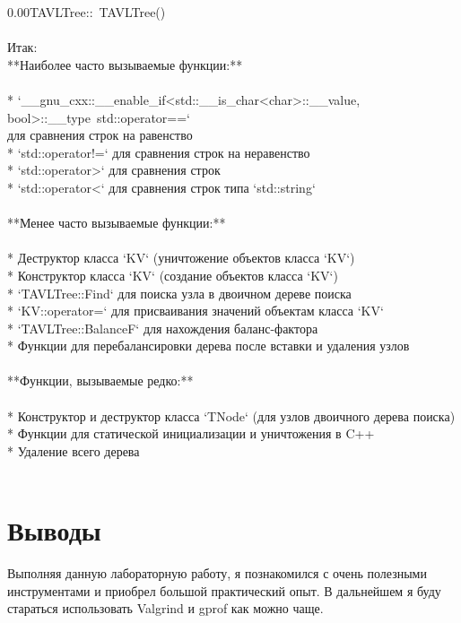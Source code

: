 \documentclass[pdf, unicode, 12pt, a4paper,oneside,fleqn]{article}
\begin{document}
\begin{tabbing}
0.00\>TAVLTree::~TAVLTree() \\
\\
Итак: \\
**Наиболее часто вызываемые функции:** \\
\\
* `\_\_gnu\_cxx::\_\_enable\_if<std::\_\_is\_char<char>::\_\_value, bool>::\_\_type\ std::operator==` \\ для сравнения строк на равенство \\
* `std::operator!=` для сравнения строк на неравенство \\
* `std::operator>` для сравнения строк \\
* `std::operator<` для сравнения строк типа `std::string` \\
\\
**Менее часто вызываемые функции:** \\
\\
* Деструктор класса `KV` (уничтожение объектов класса `KV`) \\ 
* Конструктор класса `KV` (создание объектов класса `KV`) \\ 
* `TAVLTree::Find` для поиска узла в двоичном дереве поиска \\
* `KV::operator=` для присваивания значений объектам класса `KV` \\
* `TAVLTree::BalanceF` для нахождения баланс-фактора \\
* Функции для перебалансировки дерева после вставки и удаления узлов \\ 
\\
**Функции, вызываемые редко:** \\ 
\\
* Конструктор и деструктор класса `TNode` (для узлов двоичного дерева поиска) \\
* Функции для статической инициализации и уничтожения в C++ \\ 
* Удаление всего дерева \\
\\

\end{tabbing}
\pagebreak

\section{Выводы}
Выполняя данную лабораторную работу, я познакомился с очень полезными инструментами и приобрел большой практический опыт. В дальнейшем я буду стараться использовать Valgrind и gprof как можно чаще.
\pagebreak
\end{document}
